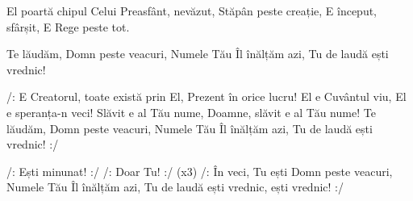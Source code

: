 \beginverse
El poartă chipul Celui Preasfânt, nevăzut,
Stăpân peste creație,
E început, sfârșit,
E Rege peste tot.
\endverse

\beginchorus
Te lăudăm, Domn peste veacuri,
Numele Tău Îl înălțăm azi,
Tu de laudă ești vrednic!
\endchorus

\beginverse
/: E Creatorul, toate există prin El,
Prezent în orice lucru!
El e Cuvântul viu, El e speranța-n veci!
Slăvit e al Tău nume,
Doamne, slăvit e al Tău nume!
Te lăudăm, Domn peste veacuri,
Numele Tău Îl înălțăm azi,
Tu de laudă ești vrednic! :/
\endverse

\beginverse*
/: Ești minunat! :/
/: Doar Tu! :/ (x3)
/: În veci, Tu ești Domn peste veacuri,
Numele Tău Îl înălțăm azi,
Tu de laudă ești vrednic, ești vrednic! :/
\endverse
\endsong